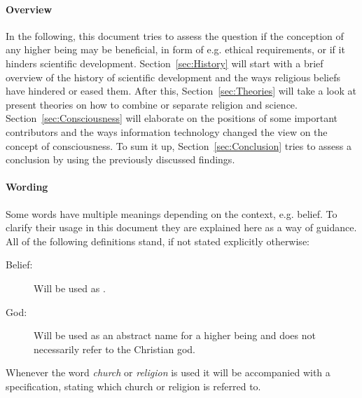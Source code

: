 \paragraph{Overview}
In the following, this document tries to assess the question if the conception of any higher being may be beneficial, in form of e.g. ethical requirements, or if it hinders scientific development.
Section~\ref{sec:History} will start with a brief overview of the history of scientific development and the ways religious beliefs have hindered or eased them.
After this, Section~\ref{sec:Theories} will take a look at present theories on how to combine or separate religion and science.
Section~\ref{sec:Consciousness} will elaborate on the positions of some important contributors and the ways information technology changed the view on the concept of consciousness.
To sum it up, Section~\ref{sec:Conclusion} tries to assess a conclusion by using the previously discussed findings.

\paragraph{Wording}
Some words have multiple meanings depending on the context, e.g. belief.
To clarify their usage in this document they are explained here as a way of guidance.
All of the following definitions stand, if not stated explicitly otherwise:
\begin{description}
    \item[Belief:] Will be used as .
    \item[God:] Will be used as an abstract name for a higher being and does not necessarily refer to the Christian god.
\end{description}
Whenever the word \emph{church} or \emph{religion} is used it will be accompanied with a specification, stating which church or religion is referred to.